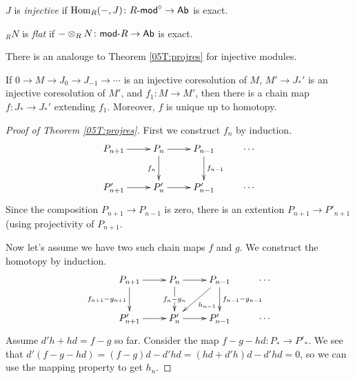 \begin{definition}
 $J$ is \emph{injective} if $\operatorname{Hom}_R(-,J)\colon R\textrm{-\sf mod}^\circ \to \text{\sf Ab}$ is exact.
\end{definition}
\begin{definition}
 ${}_R N$ is \emph{flat} if $-\otimes_R N\colon \text{\sf mod-} R\to \text{\sf Ab}$ is exact.
\end{definition}
There is an analouge to Theorem \ref{05T:projres} for injective modules.
\begin{theorem}
 If $0\to M\to J_0\to J_{-1}\to \cdots$ is an injective coresolution of $M$, $M'\to J_*'$ is an injective coresolution of $M'$, and $f_1\colon M\to M'$, then there is a chain map $f\colon J_*\to J_*'$ extending $f_1$. Moreover, $f$ is unique up to homotopy.
\end{theorem}
\begin{proof}[Proof of Theorem \ref{05T:projres}]
 First we construct $f_n$ by induction.
 \[\xymatrix{
  P_{n+1} \ar[r] & P_n\ar[d]_{f_n}\ar[r] & P_{n-1} \ar[d]^{f_{n-1}} & \cdots\\
  P'_{n+1} \ar[r] & P'_n\ar[r] & P'_{n-1}& \cdots  
 }\]
 Since the composition $P_{n+1}\to P_{n-1}$ is zero, there is an extention $P_{n+1}\to P'_{n+1}$ (using projectivity of $P_{n+1}$.
 
 Now let's assume we have two such chain maps $f$ and $g$. We construct the homotopy by induction.
 \[\xymatrix{
  P_{n+1} \ar[r] \ar[d]_{f_{n+1}-g_{n+1}} & P_n\ar[d]|{f_n-g_n}\ar[r] & P_{n-1} \ar[d]^{f_{n-1}-g_{n-1}} \ar[dl]^{h_{n-1}} & \cdots\\
  P'_{n+1} \ar[r] & P'_n\ar[r] & P'_{n-1}& \cdots  
 }\]
 Assume $d'h+hd=f-g$ so far. Consider the map $f-g-hd\colon P_*\to P'_*$. We see that $d'(f-g-hd)=(f-g)d-d'hd = (hd+d'h)d - d'hd=0$, so we can use the mapping property to get $h_n$.
\end{proof}



